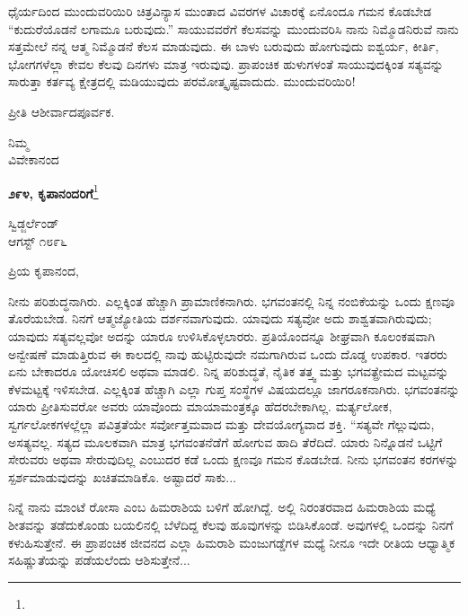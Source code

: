 ಧೈರ್ಯದಿಂದ ಮುಂದುವರಿಯಿರಿ\enginline{-} ಚಿತ್ರವಿನ್ಯಾಸ ಮುಂತಾದ ವಿವರಗಳ ವಿಚಾರಕ್ಕೆ ಏನೊಂದೂ ಗಮನ ಕೊಡಬೇಡ\enginline{-} “ಕುದುರೆಯೊಡನೆ ಲಗಾಮೂ ಬರುವುದು.” ಸಾಯುವವರೆಗೆ ಕೆಲಸವನ್ನು ಮುಂದುವರಿಸಿ\enginline{-} ನಾನು ನಿಮ್ಮೊಡನಿರುವೆ\enginline{-} ನಾನು ಸತ್ತಮೇಲೆ ನನ್ನ ಆತ್ಮ ನಿಮ್ಮೊಡನೆ ಕೆಲಸ ಮಾಡುವುದು. ಈ ಬಾಳು ಬರುವುದು ಹೋಗುವುದು\enginline{-} ಐಶ್ವರ್ಯ, ಕೀರ್ತಿ, ಭೋಗಗಳೆಲ್ಲಾ ಕೇವಲ ಕೆಲವು ದಿನಗಳು ಮಾತ್ರ ಇರುವುವು. ಪ್ರಾಪಂಚಿಕ ಹುಳುಗಳಂತೆ ಸಾಯುವುದಕ್ಕಿಂತ ಸತ್ಯವನ್ನು ಸಾರುತ್ತಾ ಕರ್ತವ್ಯ ಕ್ಷೇತ್ರದಲ್ಲಿ ಮಡಿಯುವುದು ಪರಮೋತ್ಕೃಷ್ಟವಾದುದು. ಮುಂದುವರಿಯಿರಿ!

ಪ್ರೀತಿ ಆಶೀರ್ವಾದಪೂರ್ವಕ.

\vspace{-0.5cm}

{\flushright
ನಿಮ್ಮ\\ವಿವೇಕಾನಂದ\par}

\begin{center}
\textbf{೨೯೪, ಕೃಪಾನಂದರಿಗೆ}\footnote{}
\end{center}

\vspace{-0.5cm}

\begin{flushright}
ಸ್ವಿಡ್ಜರ್ಲೆಂಡ್\\ಆಗಸ್ಟ್ ೧೮೯೬
\end{flushright}

\vspace{-0.3cm}

\noindent
ಪ್ರಿಯ ಕೃಪಾನಂದ,

ನೀನು ಪರಿಶುದ್ಧನಾಗಿರು. ಎಲ್ಲಕ್ಕಿಂತ ಹೆಚ್ಚಾಗಿ ಪ್ರಾಮಾಣಿಕನಾಗಿರು. \hbox{ಭಗವಂತನಲ್ಲಿ} ನಿನ್ನ ನಂಬಿಕೆಯನ್ನು ಒಂದು ಕ್ಷಣವೂ ತೊರೆಯಬೇಡ. ನಿನಗೆ ಆತ್ಮಜ್ಯೋತಿಯ ದರ್ಶನವಾಗುವುದು. ಯಾವುದು ಸತ್ಯವೋ ಅದು ಶಾಶ್ವತವಾಗಿರುವುದು; ಯಾವುದು ಸತ್ಯವಲ್ಲವೋ ಅದನ್ನು ಯಾರೂ ಉಳಿಸಿಕೊಳ್ಳಲಾರರು. ಪ್ರತಿಯೊಂದನ್ನೂ ಶೀಘ್ರವಾಗಿ ಕೂಲಂಕಷವಾಗಿ ಅನ್ವೇಷಣೆ ಮಾಡುತ್ತಿರುವ ಈ ಕಾಲದಲ್ಲಿ ನಾವು ಹುಟ್ಟಿರುವುದೇ ನಮಗಾಗಿರುವ ಒಂದು ದೊಡ್ಡ ಉಪಕಾರ. ಇತರರು ಏನು ಬೇಕಾದರೂ ಯೋಚಿಸಲಿ ಅಥವಾ ಮಾಡಲಿ. ನಿನ್ನ ಪರಿಶುದ್ಧತೆ, ನೈತಿಕ ತತ್ತ್ವ ಮತ್ತು ಭಗವತ್ಪ್ರೇಮದ ಮಟ್ಟವನ್ನು ಕೆಳಮಟ್ಟಕ್ಕೆ ಇಳಿಸಬೇಡ. ಎಲ್ಲಕ್ಕಿಂತ ಹೆಚ್ಚಾಗಿ ಎಲ್ಲಾ ಗುಪ್ತ ಸಂಸ್ಥೆಗಳ ವಿಷಯದಲ್ಲೂ ಜಾಗರೂಕನಾಗಿರು. ಭಗವಂತನನ್ನು ಯಾರು ಪ್ರೀತಿಸುವರೋ ಅವರು ಯಾವೊಂದು ಮಾಯಾಮಂತ್ರಕ್ಕೂ ಹೆದರಬೇಕಾಗಿಲ್ಲ. ಮರ್ತ್ಯಲೋಕ, ಸ್ವರ್ಗಲೋಕಗಳಲ್ಲೆಲ್ಲಾ ಪವಿತ್ರತೆಯೇ ಸರ್ವೋತ್ತಮವಾದ ಮತ್ತು ದೇವಯೋಗ್ಯವಾದ ಶಕ್ತಿ. “ಸತ್ಯವೇ ಗೆಲ್ಲುವುದು, ಅಸತ್ಯವಲ್ಲ. ಸತ್ಯದ ಮೂಲಕವಾಗಿ ಮಾತ್ರ ಭಗವಂತನೆಡೆಗೆ ಹೋಗುವ ಹಾದಿ ತೆರೆದಿದೆ. ಯಾರು ನಿನ್ನೊಡನೆ ಒಟ್ಟಿಗೆ ಸೇರುವರು ಅಥವಾ ಸೇರುವುದಿಲ್ಲ ಎಂಬುದರ ಕಡೆ ಒಂದು ಕ್ಷಣವೂ ಗಮನ ಕೊಡಬೇಡ. ನೀನು ಭಗವಂತನ ಕರಗಳನ್ನು ಸ್ಪರ್ಶಮಾಡುವುದನ್ನು ಖಚಿತಮಾಡಿಕೊ. ಅಷ್ಟಾದರೆ ಸಾಕು...

ನಿನ್ನೆ ನಾನು ಮಾಂಟೆ ರೋಸಾ ಎಂಬ ಹಿಮರಾಶಿಯ ಬಳಿಗೆ ಹೋಗಿದ್ದೆ. ಅಲ್ಲಿ ನಿರಂತರವಾದ ಹಿಮರಾಶಿಯ ಮಧ್ಯೆ ಶೀತವನ್ನು ತಡೆದುಕೊಂಡು ಬಯಲಿನಲ್ಲಿ ಬೆಳೆದಿದ್ದ ಕೆಲವು ಹೂವುಗಳನ್ನು ಬಿಡಿಸಿಕೊಂಡೆ. ಅವುಗಳಲ್ಲಿ ಒಂದನ್ನು ನಿನಗೆ ಕಳುಹಿಸುತ್ತೇನೆ. ಈ ಪ್ರಾಪಂಚಿಕ ಜೀವನದ ಎಲ್ಲಾ ಹಿಮರಾಶಿ ಮಂಜುಗಡ್ಡೆಗಳ ಮಧ್ಯೆ ನೀನೂ ಇದೇ ರೀತಿಯ ಆಧ್ಯಾತ್ಮಿಕ ಸಹಿಷ್ಣುತೆಯನ್ನು ಪಡೆಯಲೆಂದು ಆಶಿಸುತ್ತೇನೆ...

